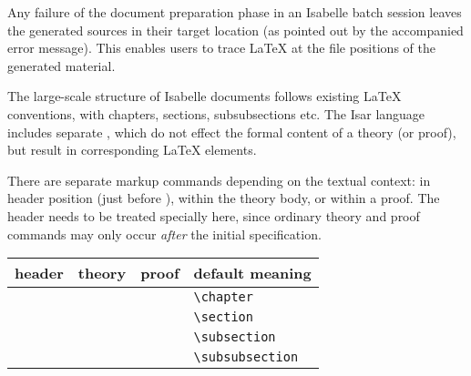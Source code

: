 \begin{isabellebody}
\begin{isamarkuptext}
  \medskip Any failure of the document preparation phase in an
  Isabelle batch session leaves the generated sources in their target
  location (as pointed out by the accompanied error message).  This
  enables users to trace {\LaTeX} at the file positions of the
  generated material.%
\end{isamarkuptext}%
\isamarkuptrue%
%
\isamarkuptrue%
%
\begin{isamarkuptext}%
The large-scale structure of Isabelle documents follows existing
  {\LaTeX} conventions, with chapters, sections, subsubsections etc.
  The Isar language includes separate , which
  do not effect the formal content of a theory (or proof), but result
  in corresponding {\LaTeX} elements.

  There are separate markup commands depending on the textual context:
  in header position (just before ), within the
  theory body, or within a proof.  The header needs to be treated
  specially here, since ordinary theory and proof commands may only
  occur \emph{after} the initial  specification.

  \medskip

  \begin{tabular}{llll}
  header & theory & proof & default meaning \\\hline
    & \commdx{chapter} & & \verb,\chapter, \\
  \commdx{header} & \commdx{section} & \commdx{sect} & \verb,\section, \\
    & \commdx{subsection} & \commdx{subsect} & \verb,\subsection, \\
    & \commdx{subsubsection} & \commdx{subsubsect} & \verb,\subsubsection, \\
  \end{tabular}

  \medskip


\end{isamarkuptext}
\end{isabellebody}
